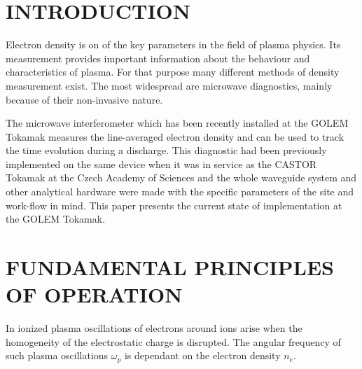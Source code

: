 \documentclass[a4paper,twoside]{articlek}
\begin{document}
\sloppy
{}
\section{INTRODUCTION}
Electron density is on of the key parameters in the field of plasma physics. Its measurement provides important information about the behaviour and characteristics of plasma. For that purpose many different methods of density measurement exist.%
The most widespread are microwave diagnostics, mainly because of their non-invasive nature. 

The microwave interferometer which has been recently installed at the GOLEM Tokamak measures the line-averaged electron density and can be used to track the time evolution during a discharge.%
This diagnostic had been previously implemented on the same device when it was in service as the CASTOR Tokamak %
at the Czech Academy of Sciences and the whole waveguide system and other analytical hardware were made with the specific parameters of the site and work-flow in mind. This paper presents the current state of implementation at the GOLEM Tokamak.

\section{FUNDAMENTAL PRINCIPLES OF OPERATION} %

In ionized plasma oscillations of electrons around ions arise when the homogeneity of the electrostatic charge is disrupted. The angular frequency of such plasma oscillations $\omega_p$ is dependant on the electron density $n_e$. 
\end{document}

